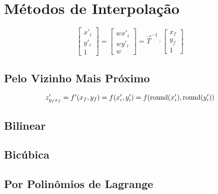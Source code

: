 \section{Métodos de Interpolação} \label{sec:interp}

\[
    \begin{bmatrix}
        x'_i \\
        y'_i \\
        1
    \end{bmatrix}
    = \begin{bmatrix}
        w x'_i \\
        w y'_i \\
        w
    \end{bmatrix}
    = \vec{T}^{-1} \cdot \begin{bmatrix}
        x_f \\
        y_f \\
        1
    \end{bmatrix}
\]

\subsection{Pelo Vizinho Mais Próximo} \label{sec:interp:vizinho}

\[
    z'_{y_f x_f} = f'(x_f, y_f) = f(x'_i, y'_i) = f(\operatorname{round}(x'_i), \operatorname{round}(y'_i))
\]

\subsection{Bilinear} \label{sec:interp:bilinear}

\subsection{Bicúbica} \label{sec:interp:bicubica}

\subsection{Por Polinômios de Lagrange} \label{sec:interp:lagrange}
